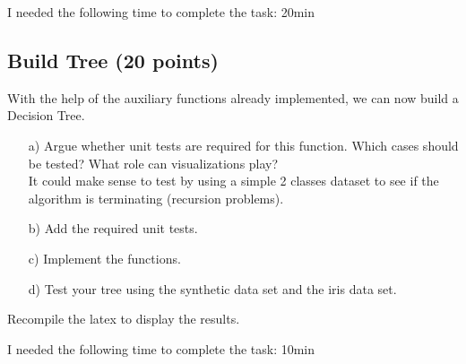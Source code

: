 I needed the following time to complete the task: 20min

\subsection{Build Tree (20 points)}

With the help of the auxiliary functions already implemented, we can now build a Decision Tree. 

\begin{enumerate}

\item[a)] Argue whether unit tests are required for this function. Which cases should be tested? What role can visualizations play? 
\\
It could make sense to test by using a simple 2 classes dataset to see if the algorithm is terminating (recursion problems).

\item[b)] Add the required unit tests.

\item[c)] Implement the functions.

\item[d)] Test your tree using the synthetic data set and the iris data set.

\end{enumerate}

Recompile the latex to display the results.

I needed the following time to complete the task: 10min

